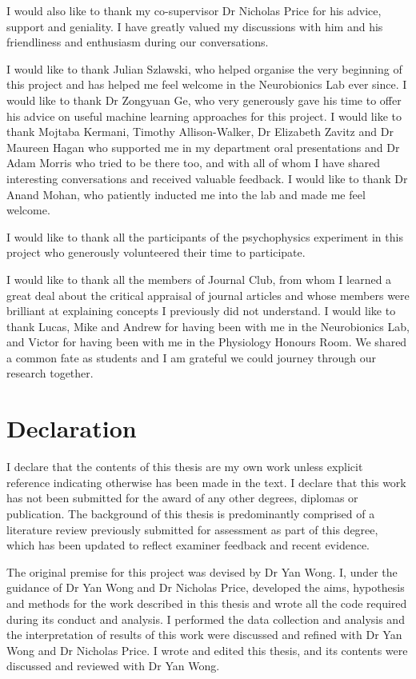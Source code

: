 \documentclass[a4paper,11pt,openany]{book}
\begin{document}
I would also like to thank my co-supervisor Dr Nicholas Price for his advice, support and geniality.
I have greatly valued my discussions with him and his friendliness and enthusiasm during our conversations.

I would like to thank Julian Szlawski, who helped organise the very beginning of this project and has helped me feel welcome in the Neurobionics Lab ever since.
I would like to thank Dr Zongyuan Ge, who very generously gave his time to offer his advice on useful machine learning approaches for this project.
I would like to thank Mojtaba Kermani, Timothy Allison-Walker, Dr Elizabeth Zavitz and Dr Maureen Hagan who supported me in my department oral presentations and Dr Adam Morris who tried to be there too, and with all of whom I have shared interesting conversations and received valuable feedback.
I would like to thank Dr Anand Mohan, who patiently inducted me into the lab and made me feel welcome.

I would like to thank all the participants of the psychophysics experiment in this project who generously volunteered their time to participate.

I would like to thank all the members of Journal Club, from whom I learned a great deal about the critical appraisal of journal articles and whose members were brilliant at explaining concepts I previously did not understand.
I would like to thank Lucas, Mike and Andrew for having been with me in the Neurobionics Lab, and Victor for having been with me in the Physiology Honours Room.
We shared a common fate as students and I am grateful we could journey through our research together.

\clearpage

\section*{Declaration}

I declare that the contents of this thesis are my own work unless explicit reference indicating otherwise has been made in the text.
I declare that this work has not been submitted for the award of any other degrees, diplomas or publication.
The background of this thesis is predominantly comprised of a literature review previously submitted for assessment as part of this degree, which has been updated to reflect examiner feedback and recent evidence.

The original premise for this project was devised by Dr Yan Wong.
I, under the guidance of Dr Yan Wong and Dr Nicholas Price, developed the aims, hypothesis and methods for the work described in this thesis and wrote all the code required during its conduct and analysis.
I performed the data collection and analysis and the interpretation of results of this work were discussed and refined with Dr Yan Wong and Dr Nicholas Price.
I wrote and edited this thesis, and its contents were discussed and reviewed with Dr Yan Wong.
\end{document}
